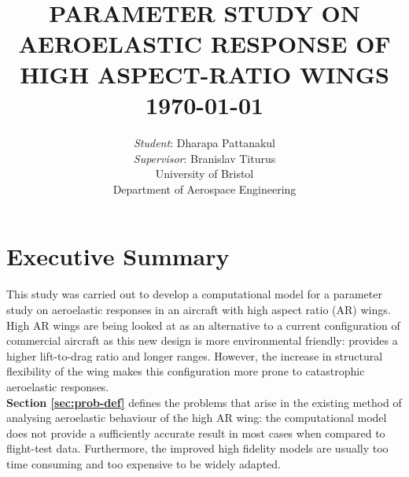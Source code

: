 \documentclass[11pt]{article}
\begin{document}
{\selectfont
\title{ \normalsize \textsc{}
		\\ [2.0cm]
		\HRule{0.5pt} \\
		\LARGE \textbf{\uppercase{Parameter Study on Aeroelastic Response of  High Aspect-Ratio Wings}
		\HRule{2pt} \\ [0.5cm]
		\normalsize \today \vspace*{5\baselineskip}}
		}
}

\date{}

\author{
        \textit{Student}: Dharapa Pattanakul\\ 
        \textit{Supervisor}: Branislav Titurus\\
		University of Bristol \\
		Department of Aerospace Engineering }

\vfill
\titlepic{}
\maketitle
\thispagestyle{empty}


\newpage
{} 
\section*{Executive Summary}
This study was carried out to develop a computational model for a parameter study on aeroelastic responses in an aircraft with high aspect ratio (AR) wings. High AR wings are being looked at as an alternative to a current configuration of commercial aircraft as this new design is more environmental friendly: provides a higher lift-to-drag ratio and longer ranges. However, the increase in structural flexibility of the wing makes this configuration more prone to catastrophic aeroelastic responses.\\

\textbf{Section \ref{sec:prob-def}} defines the problems that arise in the existing method of analysing aeroelastic behaviour of the high AR wing: the computational model does not provide a sufficiently accurate result in most cases when compared to flight-test data. Furthermore, the improved high fidelity models are usually too time consuming and too expensive to be widely adapted.\cite{Jones2015PreliminaryExperiment}\\
\end{document}
